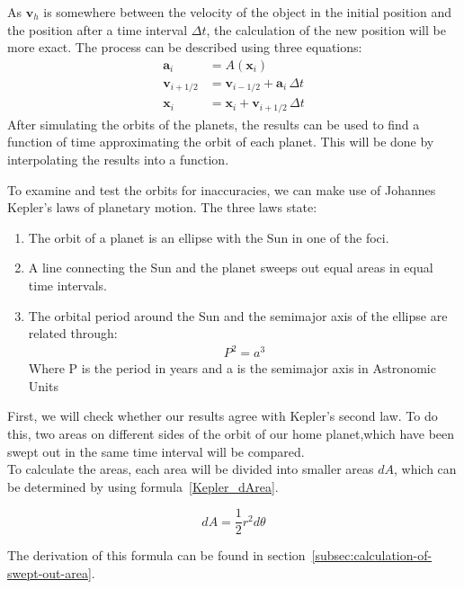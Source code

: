 \documentclass[reprint,english,notitlepage]{revtex4-2}
\begin{document}
As $\textbf{v}_h$ is somewhere between the velocity of the object in the initial position and the position after a time interval $\Delta t$, the calculation of the new position will be more exact.
The process can be described using three equations:
\begin{align*}
    \textbf{a}_i &= A(\textbf{x}_i)\\
	\textbf{v}_{i+1/2} &= \textbf{v}_{i-1/2} + \textbf{a}_i\,\Delta t\\
	\textbf{x}_{i} &= \textbf{x}_i + \textbf{v}_{i+1/2}\,\Delta t
\end{align*}
After simulating the orbits of the planets, the results can be used to find a function of time approximating the orbit of each planet.
This will be done by interpolating the results into a function.\newline \newline

To examine and test the orbits for inaccuracies, we can make use of Johannes Kepler's laws of planetary motion.
The three laws state:
\begin{enumerate}
    \item The orbit of a planet is an ellipse with the
		Sun in one of the foci.
	\item A line connecting the Sun and the planet
		sweeps out equal areas in equal time intervals.
	\item The orbital period around the Sun and the
		semimajor axis of the ellipse are related through:
		\begin{align*}
		    P^2 = a^3
		\end{align*}
		Where P is the period in years and a is the semimajor axis in Astronomic Units~\parencite[][]{lecture_notes_1b}
\end{enumerate}

First, we will check whether our results agree with Kepler's second law.
To do this, two areas on different sides of the orbit of our home planet,which have been swept out in the same time interval will be compared.\\
To calculate the areas, each area will be divided into smaller areas $dA$, which can be determined by using formula~\eqref{Kepler_dArea}.

\begin{equation} \label{Kepler_dArea}
    dA = \frac{1}{2}r^2 d\theta 
\end{equation}

The derivation of this formula can be found in section~\ref{subsec:calculation-of-swept-out-area}.\\
\end{document}

